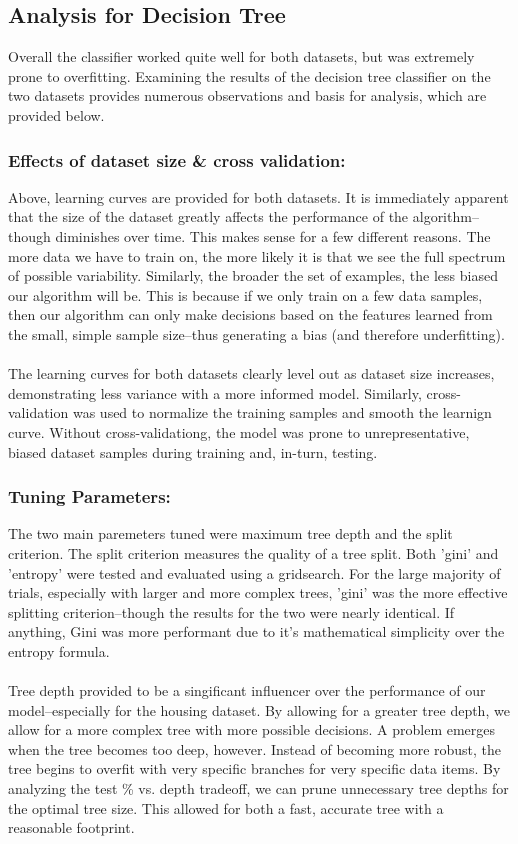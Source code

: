 \documentclass[h]{article}
\begin{document}
\subsection*{Analysis for Decision Tree}
Overall the classifier worked quite well for both datasets, but was extremely prone to 
overfitting.  Examining the results of the decision tree classifier on the two 
datasets provides numerous observations and basis for analysis, which are provided below.

\subsubsection*{Effects of dataset size & cross validation:}
Above, learning curves are provided for both datasets.  It is immediately 
apparent that the size of the dataset greatly affects the performance of the 
algorithm--though diminishes over time. This makes sense for a few different 
reasons.  The more data we have to train on, the more likely it is that 
we see the full spectrum of possible variability.  Similarly, the broader the 
set of examples, the less biased our algorithm will be.  This is because if we 
only train on a few data samples, then our algorithm can only make decisions 
based on the features learned from the small, simple sample size--thus generating a bias (and therefore 
underfitting).
\\ \\ 
The learning curves for both datasets clearly level out as 
dataset size increases, demonstrating less variance with a more informed model.  
Similarly, cross-validation was used to normalize the training 
samples and smooth the learnign curve.  Without cross-validationg, the model was 
prone to unrepresentative, biased dataset samples during training and, in-turn, testing.
\subsubsection*{Tuning Parameters:}
The two main paremeters tuned were maximum tree depth and the split criterion.  
The split criterion measures the quality of a tree split.  Both 'gini' and 
'entropy' were tested and evaluated using a gridsearch.  For the large majority 
of trials, especially with larger and more complex trees, 'gini' was the more 
effective splitting criterion--though the results for the two were nearly 
identical.  If anything, Gini was more performant due to it's mathematical 
simplicity over the entropy formula.
\\ \\
Tree depth provided to be a singificant influencer over the performance of our 
model--especially for the housing dataset.  By allowing for a greater tree 
depth, we allow for a more complex tree with more possible decisions.  A problem 
emerges when the tree becomes too deep, however.  Instead of becoming more 
robust, the tree begins to overfit with very specific branches for very specific 
data items.  By analyzing the test \% vs. depth tradeoff, we can prune 
unnecessary tree depths for the optimal tree size.  This allowed for both a 
fast, accurate tree with a reasonable footprint.
\end{document}
